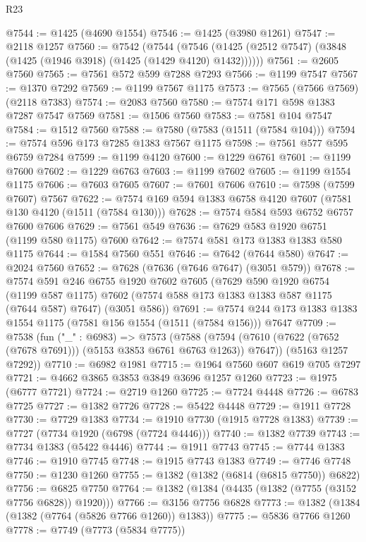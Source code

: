 \begin{lexlean}{R23}
\begin{coremodule}
@7544 := @1425 (@4690 @1554)
@7546 := @1425 (@3980 @1261)
@7547 := @2118 @1257
@7560 := @7542
    (@7544 (@7546 (@1425 (@2512 @7547) (@3848 (@1425 (@1946 @3918) (@1425 (@1429 @4120) @1432))))))
@7561 := @2605 @7560
@7565 := @7561 @572 @599 @7288 @7293
@7566 := @1199 @7547
@7567 := @1370 @7292
@7569 := @1199 @7567 @1175
@7573 := @7565 (@7566 @7569) (@2118 @7383)
@7574 := @2083 @7560
@7580 := @7574 @171 @598 @1383 @7287 @7547 @7569
@7581 := @1506 @7560
@7583 := @7581 @104 @7547
@7584 := @1512 @7560
@7588 := @7580 (@7583 (@1511 (@7584 @104)))
@7594 := @7574 @596 @173 @7285 @1383 @7567 @1175
@7598 := @7561 @577 @595 @6759 @7284
@7599 := @1199 @4120
@7600 := @1229 @6761
@7601 := @1199 @7600
@7602 := @1229 @6763
@7603 := @1199 @7602
@7605 := @1199 @1554 @1175
@7606 := @7603 @7605
@7607 := @7601 @7606
@7610 := @7598 (@7599 @7607) @7567
@7622 := @7574 @169 @594 @1383 @6758 @4120 @7607 (@7581 @130 @4120 (@1511 (@7584 @130)))
@7628 := @7574 @584 @593 @6752 @6757 @7600 @7606
@7629 := @7561 @549
@7636 := @7629 @583 @1920 @6751 (@1199 @580 @1175) @7600
@7642 := @7574 @581 @173 @1383 @1383 @580 @1175
@7644 := @1584 @7560 @551
@7646 := @7642 (@7644 @580)
@7647 := @2024 @7560
@7652 := @7628 (@7636 (@7646 @7647) (@3051 @579))
@7678 := @7574
    @591
    @246
    @6755
    @1920
    @7602
    @7605
    (@7629
      @590
      @1920
      @6754
      (@1199 @587 @1175)
      @7602
      (@7574 @588 @173 @1383 @1383 @587 @1175 (@7644 @587) @7647)
      (@3051 @586))
@7691 := @7574 @244 @173 @1383 @1383 @1554 @1175 (@7581 @156 @1554 (@1511 (@7584 @156))) @7647
@7709 := @7538
    (fun ("_" : @6983) =>
    @7573
      (@7588 (@7594 (@7610 (@7622 (@7652 (@7678 @7691))) (@5153 @3853 @6761 @6763 @1263)) @7647))
      (@5163 @1257 @7292))
@7710 := @6982 @1981
@7715 := @1964 @7560 @607 @619 @705 @7297
@7721 := @4662 @3865 @3853 @3849 @3696 @1257 @1260
@7723 := @1975 (@6777 @7721)
@7724 := @2719 @1260
@7725 := @7724 @4448
@7726 := @6783 @7725
@7727 := @1382 @7726
@7728 := @5422 @4448
@7729 := @1911 @7728
@7730 := @7729 @1383
@7734 := @1910 @7730 (@1915 @7728 @1383)
@7739 := @7727 (@7734 @1920 (@6798 (@7724 @4446)))
@7740 := @1382 @7739
@7743 := @7734 @1383 (@5422 @4446)
@7744 := @1911 @7743
@7745 := @7744 @1383
@7746 := @1910 @7745
@7748 := @1915 @7743 @1383
@7749 := @7746 @7748
@7750 := @1230 @1260
@7755 := @1382 (@1382 (@6814 (@6815 @7750)) @6822)
@7756 := @6825 @7750
@7764 := @1382 (@1384 (@4435 (@1382 (@7755 (@3152 @7756 @6828)) @1920)))
@7766 := @3156 @7756 @6828
@7773 := @1382 (@1384 (@1382 (@7764 (@5826 @7766 @1260)) @1383))
@7775 := @5836 @7766 @1260
@7778 := @7749 (@7773 (@5834 @7775))

\end{coremodule}
\end{lexlean}
